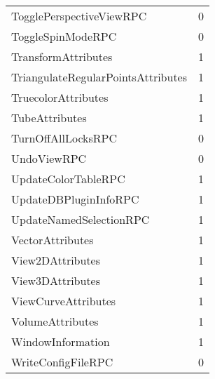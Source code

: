 \documentclass[10pt,a4paper]{report}
\begin{document}
\begin{longtable}{ll}
TogglePerspectiveViewRPC & 0 \\
ToggleSpinModeRPC & 0 \\
TransformAttributes & 1 \\
TriangulateRegularPointsAttributes & 1 \\
TruecolorAttributes & 1 \\
TubeAttributes & 1 \\
TurnOffAllLocksRPC & 0 \\
UndoViewRPC & 0 \\
UpdateColorTableRPC & 1 \\
UpdateDBPluginInfoRPC & 1 \\
UpdateNamedSelectionRPC & 1 \\
VectorAttributes & 1 \\
View2DAttributes & 1 \\
View3DAttributes & 1 \\
ViewCurveAttributes & 1 \\
VolumeAttributes & 1 \\
WindowInformation & 1 \\
WriteConfigFileRPC & 0 \\
\end{longtable}

\end{document}
